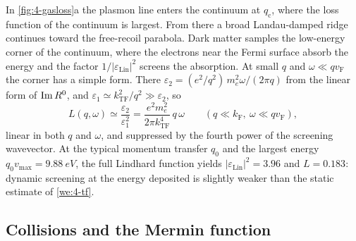 In \cref{fig:4-gasloss}a the plasmon line enters the continuum at $q_{\mathrm{c}}$, where the loss function of the continuum is largest. From there a broad Landau-damped ridge continues toward the free-recoil parabola. Dark matter samples the low-energy corner of the continuum, where the electrons near the Fermi surface absorb the energy and the factor $1/|\varepsilon_{\mathrm{Lin}}|^2$ screens the absorption. At small $q$ and $\omega \ll qv_{\mathrm{F}}$ the corner has a simple form. There $\varepsilon_2 = (e^2/q^2)\,m_e^2\omega/(2\pi q)$ from the linear form of $\operatorname{Im} R^0$, and $\varepsilon_1 \simeq k_{\mathrm{TF}}^2/q^2 \gg \varepsilon_2$, so
\begin{equation*}
  L(q,\omega) \simeq \frac{\varepsilon_2}{\varepsilon_1^2} = \frac{e^2m_e^2}{2\pi k_{\mathrm{TF}}^4}\,q\,\omega \qquad (q \ll k_{\mathrm{F}},\ \omega \ll qv_{\mathrm{F}}) ,
\end{equation*}
linear in both $q$ and $\omega$, and suppressed by the fourth power of the screening wavevector. At the typical momentum transfer $q_0$ and the largest energy $q_0v_{\mathrm{max}} = \SI{9.88}{eV}$, the full Lindhard function yields $|\varepsilon_{\mathrm{Lin}}|^2 = 3.96$ and $L = 0.183$: dynamic screening at the energy deposited is slightly weaker than the static estimate of \cref{we:4-tf}.

\subsection{Collisions and the Mermin function}

